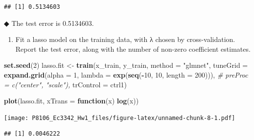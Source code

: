 \documentclass[]{article}
\newenvironment{Shaded}{\begin{snugshade}}{\end{snugshade}}
\newcommand{\CommentTok}[1]{\textcolor[rgb]{0.56,0.35,0.01}{\textit{#1}}}
\newcommand{\ControlFlowTok}[1]{\textcolor[rgb]{0.13,0.29,0.53}{\textbf{#1}}}
\newcommand{\DataTypeTok}[1]{\textcolor[rgb]{0.13,0.29,0.53}{#1}}
\newcommand{\DecValTok}[1]{\textcolor[rgb]{0.00,0.00,0.81}{#1}}
\newcommand{\KeywordTok}[1]{\textcolor[rgb]{0.13,0.29,0.53}{\textbf{#1}}}
\newcommand{\NormalTok}[1]{#1}
\newcommand{\OperatorTok}[1]{\textcolor[rgb]{0.81,0.36,0.00}{\textbf{#1}}}
\newcommand{\StringTok}[1]{\textcolor[rgb]{0.31,0.60,0.02}{#1}}
\providecommand{\tightlist}{%
  \setlength{\itemsep}{0pt}\setlength{\parskip}{0pt}}
\begin{document}
\begin{verbatim}
## [1] 0.5134603
\end{verbatim}

◆ The test error is 0.5134603.

\begin{enumerate}
\def\labelenumi{\alph{enumi})}
\setcounter{enumi}{2}
\tightlist
\item
  Fit a lasso model on the training data, with λ chosen by
  cross-validation. Report the test error, along with the number of
  non-zero coefficient estimates.
\end{enumerate}

\begin{Shaded}
\begin{Highlighting}[]
\KeywordTok{set.seed}\NormalTok{(}\DecValTok{2}\NormalTok{)}
\NormalTok{lasso.fit <-}\StringTok{ }\KeywordTok{train}\NormalTok{(x_train, y_train,}
                   \DataTypeTok{method =} \StringTok{"glmnet"}\NormalTok{,}
                   \DataTypeTok{tuneGrid =} \KeywordTok{expand.grid}\NormalTok{(}\DataTypeTok{alpha =} \DecValTok{1}\NormalTok{, }
                                          \DataTypeTok{lambda =} \KeywordTok{exp}\NormalTok{(}\KeywordTok{seq}\NormalTok{(}\OperatorTok{-}\DecValTok{10}\NormalTok{, }\DecValTok{10}\NormalTok{, }\DataTypeTok{length =} \DecValTok{200}\NormalTok{))),}
                   \CommentTok{# preProc = c("center", "scale"),}
                   \DataTypeTok{trControl =}\NormalTok{ ctrl1)}

\KeywordTok{plot}\NormalTok{(lasso.fit, }\DataTypeTok{xTrans =} \ControlFlowTok{function}\NormalTok{(x) }\KeywordTok{log}\NormalTok{(x))}
\end{Highlighting}
\end{Shaded}

\texttt{[image: P8106\_Ec3342\_Hw1\_files/figure-latex/unnamed-chunk-8-1.pdf]}

\begin{Shaded}
\end{Shaded}

\begin{verbatim}
## [1] 0.0046222
\end{verbatim}

\begin{Shaded}
\end{Shaded}
\end{document}
